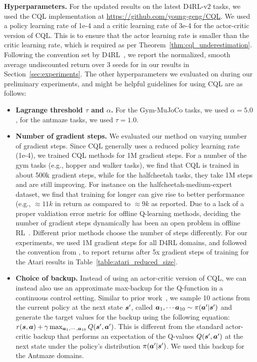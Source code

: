 \textbf{Hyperparameters.} For the updated results on the latest D4RL-v2 tasks, we used the CQL implementation at \url{https://github.com/young-geng/CQL}. We used a policy learning rate of 1e-4 and a critic learning rate of 3e-4 for the actor-critic version of CQL. This is to ensure that the actor learning rate is smaller than the critic learning rate, which is required as per Theorem~\ref{thm:cql_underestimation}. Following the convention set by D4RL~\citep{d4rl}, we report the normalized, smooth average undiscounted return over 3 seeds for in our results in Section~\ref{sec:experiments}.
The other hyperparameters we evaluated on during our preliminary experiments, and might be helpful guidelines for using CQL are as follows:
\begin{itemize}
    \item \textbf{Lagrange threshold $\tau$ and $\alpha$.} For the Gym-MuJoCo tasks, we used $\alpha=5.0$, for the antmaze tasks, we used $\tau=1.0$.
    \item \textbf{Number of gradient steps.} We evaluated our method on varying number of gradient steps. Since CQL generally uses a reduced policy learning rate (1e-4), we trained CQL methods for 1M gradient steps. For a number of the gym tasks (e.g., hopper and walker tasks), we find that CQL is trained in about 500k gradient steps, while for the halfcheetah tasks, they take 1M steps and are still improving. For instance on the halfcheetah-medium-expert dataset, we find that training for longer can give rise to better performance (e.g., $\approx 11k$ in return as compared to $\approx 9k$ as reported. Due to a lack of a proper valdiation error metric for offline Q-learning methods, deciding the number of gradient steps dynamically has been an open problem in offline RL~\citep{levine2020offline}. Different prior methods choose the number of steps differently. For our experiments, we used 1M gradient steps for all D4RL domains, and followed the convention from \citet{agarwal2019optimistic}, to report returns after 5x gradient steps of training for the Atari results in Table~\ref{table:atari_reduced_size}.  
    \item \textbf{Choice of backup.} Instead of using an actor-critic version of CQL, we can instead also use an approximate max-backup for the Q-function in a continuous control setting. Similar to prior work~\citep{kumar2019stabilizing}, we sample 10 actions from the current policy at the next state $\boldsymbol{s}'$, called $\boldsymbol{a}_1, \cdots \boldsymbol{a}_{10} \sim \pi(\boldsymbol{a}'|\boldsymbol{s}')$ and generate the target values for the backup using the following equation: $r(\boldsymbol{s}, \boldsymbol{a}) +  \gamma \max_{\boldsymbol{a}_1, \cdots, \boldsymbol{a}_{10}} Q(\boldsymbol{s}', \boldsymbol{a}')$. This is different from the standard actor-critic backup that performs an expectation of the Q-values $Q(\boldsymbol{s}', \boldsymbol{a}')$ at the next state under the policy's distribution $\pi(\boldsymbol{a}'|\boldsymbol{s}')$. We used this backup for the Antmaze domains.

\end{itemize}
